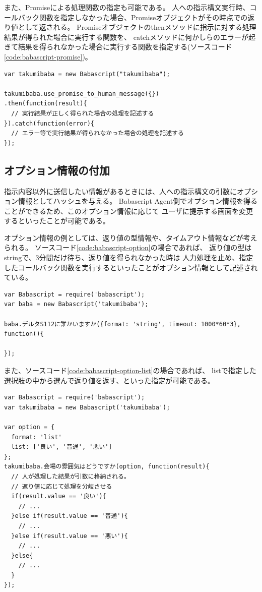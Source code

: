 また、Promiseによる処理関数の指定も可能である。
人への指示構文実行時、コールバック関数を指定しなかった場合、Promiseオブジェクトがその時点での返り値として返される。
Promiseオブジェクトのthenメソッドに指示に対する処理結果が得られた場合に実行する関数を、
catchメソッドに何かしらのエラーが起きて結果を得られなかった場合に実行する関数を指定する(ソースコード\ref{code:babascript-promise})。

\begin{lstlisting}[caption=Promiseによる関数指定, label=code:babascript-promise]
var takumibaba = new Babascript("takumibaba");

takumibaba.use_promise_to_human_message({})
.then(function(result){
  // 実行結果が正しく得られた場合の処理を記述する
}).catch(function(error){
  // エラー等で実行結果が得られなかった場合の処理を記述する
});
\end{lstlisting}

\subsection{オプション情報の付加}\label{ux30aaux30d7ux30b7ux30e7ux30f3ux60c5ux5831ux306eux4ed8ux52a0}

指示内容以外に送信したい情報があるときには、人への指示構文の引数にオプション情報としてハッシュを与える。
Babascript
Agent側でオプション情報を得ることができるため、このオプション情報に応じて
ユーザに提示する画面を変更するといったことが可能である。

オプション情報の例としては、返り値の型情報や、タイムアウト情報などが考えられる。
ソースコード\ref{code:babascript-option}の場合であれば、
返り値の型はstringで、3分間だけ待ち、返り値を得られなかった時は
人力処理を止め、指定したコールバック関数を実行するといったことがオプション情報として記述されている。

\begin{lstlisting}[caption=オプション情報のサンプルソースコードその1, label=code:babascript-option]
var Babascript = require('babascript');
var baba = new Babascript('takumibaba');

baba.デルタS112に誰かいますか({format: 'string', timeout: 1000*60*3}, function(){

});
\end{lstlisting}

また、ソースコード\ref{code:babascript-option-list}の場合であれば、
listで指定した選択肢の中から選んで返り値を返す、といった指定が可能である。

\begin{lstlisting}[caption=オプション情報のサンプルソースコードその2, label=code:babascript-option-list]
var Babascript = require('babascript');
var takumibaba = new Babascript('takumibaba');

var option = {
  format: 'list'
  list: ['良い', '普通', '悪い']
};
takumibaba.会場の雰囲気はどうですか(option, function(result){
  // 人が処理した結果が引数に格納される。
  // 返り値に応じて処理を分岐させる
  if(result.value == '良い'){
    // ...
  }else if(result.value == '普通'){
    // ...
  }else if(result.value == '悪い'){
    // ...
  }else{
    // ...
  }
});

\end{lstlisting}

